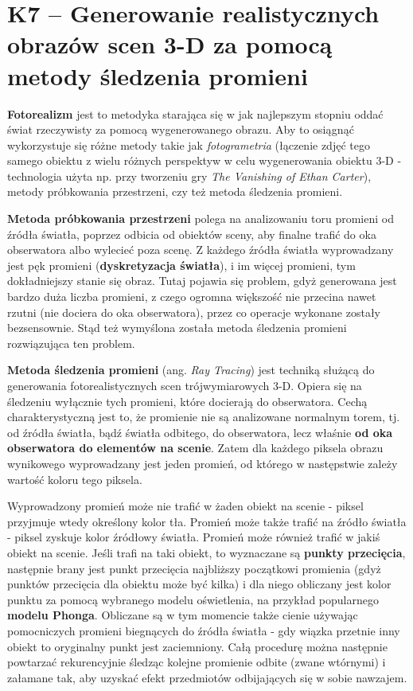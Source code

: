 \section{K7 -- Generowanie realistycznych obrazów scen 3-D za pomocą metody śledzenia promieni}

\textbf{Fotorealizm} jest to metodyka starająca się w jak najlepszym stopniu oddać świat rzeczywisty za pomocą wygenerowanego obrazu. Aby to osiągnąć wykorzystuje się różne metody takie jak \textit{fotogrametria} (łączenie zdjęć tego samego obiektu z wielu różnych perspektyw w celu wygenerowania obiektu 3-D - technologia użyta np. przy tworzeniu gry \textit{The Vanishing of Ethan Carter}), metody próbkowania przestrzeni, czy też metoda śledzenia promieni. 

\textbf{Metoda próbkowania przestrzeni} polega na analizowaniu toru promieni od źródła światła, poprzez odbicia od obiektów sceny, aby finalne trafić do oka obserwatora albo wylecieć poza scenę. Z każdego źródła światła wyprowadzany jest pęk promieni (\textbf{dyskretyzacja światła}), i im więcej promieni, tym dokładniejszy stanie się obraz. Tutaj pojawia się problem, gdyż generowana jest bardzo duża liczba promieni, z czego ogromna większość nie przecina nawet rzutni (nie dociera do oka obserwatora), przez co operacje wykonane zostały bezsensownie. Stąd też wymyślona została metoda śledzenia promieni rozwiązująca ten problem.

\textbf{Metoda śledzenia promieni} (ang. \textit{Ray Tracing}) jest techniką służącą do generowania fotorealistycznych scen trójwymiarowych 3-D. Opiera się na śledzeniu wyłącznie tych promieni, które docierają do obserwatora. Cechą charakterystyczną jest to, że promienie nie są analizowane normalnym torem, tj. od źródła światła, bądź światła odbitego, do obserwatora, lecz właśnie \textbf{od oka obserwatora do elementów na scenie}. Zatem dla każdego piksela obrazu wynikowego wyprowadzany jest jeden promień, od którego w następstwie zależy wartość koloru tego piksela.

Wyprowadzony promień może nie trafić w żaden obiekt na scenie - piksel przyjmuje wtedy określony kolor tła. Promień może także trafić na źródło światła - piksel zyskuje kolor źródłowy światła. Promień może również trafić w jakiś obiekt na scenie. Jeśli trafi na taki obiekt, to wyznaczane są \textbf{punkty przecięcia}, następnie brany jest punkt przecięcia najbliższy początkowi promienia (gdyż punktów przecięcia dla obiektu może być kilka) i dla niego obliczany jest kolor punktu za pomocą wybranego modelu oświetlenia, na przykład popularnego \textbf{modelu Phonga}. Obliczane są w tym momencie także cienie używając pomocniczych promieni biegnących do źródła światła - gdy wiązka przetnie inny obiekt to oryginalny punkt jest zaciemniony. Całą procedurę można następnie powtarzać rekurencyjnie śledząc kolejne promienie odbite (zwane wtórnymi) i załamane tak, aby uzyskać efekt przedmiotów odbijających się w sobie nawzajem.

